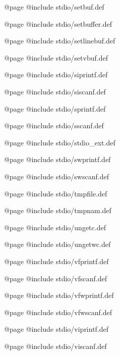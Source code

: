 @page
@include stdio/setbuf.def

@page
@include stdio/setbuffer.def

@page
@include stdio/setlinebuf.def

@page
@include stdio/setvbuf.def

@page
@include stdio/siprintf.def

@page
@include stdio/siscanf.def

@page
@include stdio/sprintf.def

@page
@include stdio/sscanf.def

@page
@include stdio/stdio_ext.def

@page
@include stdio/swprintf.def

@page
@include stdio/swscanf.def

@page
@include stdio/tmpfile.def

@page
@include stdio/tmpnam.def

@page
@include stdio/ungetc.def

@page
@include stdio/ungetwc.def

@page
@include stdio/vfprintf.def

@page
@include stdio/vfscanf.def

@page
@include stdio/vfwprintf.def

@page
@include stdio/vfwscanf.def

@page
@include stdio/viprintf.def

@page
@include stdio/viscanf.def
